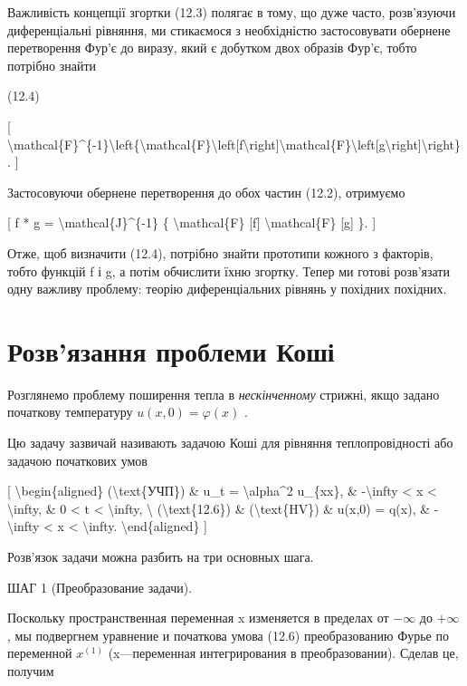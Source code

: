 \documentclass[
]{article}
\begin{document}
Важливість концепції згортки (12.3) полягає в тому, що дуже часто,
розв'язуючи диференціальні рівняння, ми стикаємося з необхідністю
застосовувати обернене перетворення Фур'є до виразу, який є добутком
двох образів Фур'є, тобто потрібно знайти

(12.4)

{[}
\textbackslash mathcal\{F\}\^{}\{-1\}\textbackslash left\{\textbackslash mathcal\{F\}\textbackslash left{[}f\textbackslash right{]}\textbackslash mathcal\{F\}\textbackslash left{[}g\textbackslash right{]}\textbackslash right\}.
{]}

Застосовуючи обернене перетворення до обох частин (12.2), отримуємо

{[} f * g = \textbackslash mathcal\{J\}\^{}\{-1\} \{
\textbackslash mathcal\{F\} {[}f{]} \textbackslash mathcal\{F\} {[}g{]}
\}. {]}

Отже, щоб визначити (12.4), потрібно знайти прототипи кожного з
факторів, тобто функцій f і g, а потім обчислити їхню згортку. Тепер ми
готові розв'язати одну важливу проблему: теорію диференціальних рівнянь
у похідних похідних.

\section{Розв'язання проблеми
Коші}\label{ux440ux43eux437ux432ux44fux437ux430ux43dux43dux44f-ux43fux440ux43eux431ux43bux435ux43cux438-ux43aux43eux448ux456}

Розглянемо проблему поширення тепла в \emph{нескінченному} стрижні, якщо
задано початкову температуру \(u(x, 0) = \varphi(x)\) .

Цю задачу зазвичай називають задачою Коші для рівняння теплопровідності
або задачою початкових умов

{[} \textbackslash begin\{aligned\} (\textbackslash text\{УЧП\}) \& u\_t
= \textbackslash alpha\^{}2 u\_\{xx\}, \& -\textbackslash infty
\textless{} x \textless{} \textbackslash infty, \& 0 \textless{} t
\textless{} \textbackslash infty, \textbackslash{}
(\textbackslash text\{12.6\}) \& (\textbackslash text\{HV\}) \& u(x,0) =
q(x), \& -\textbackslash infty \textless{} x \textless{}
\textbackslash infty. \textbackslash end\{aligned\} {]}

Розв'язок задачи можна разбить на три основных шага.

ШАГ 1 (Преобразование задачи).

Поскольку пространственная переменная x изменяется в пределах от
\(-\infty\) до \(+\infty\) , мы подвергнем уравнение и початкова умова
(12.6) преобразованию Фурье по переменной \(x^{(1)}\) (x---переменная
интегрирования в преобразовании). Сделав це, получим
\end{document}
